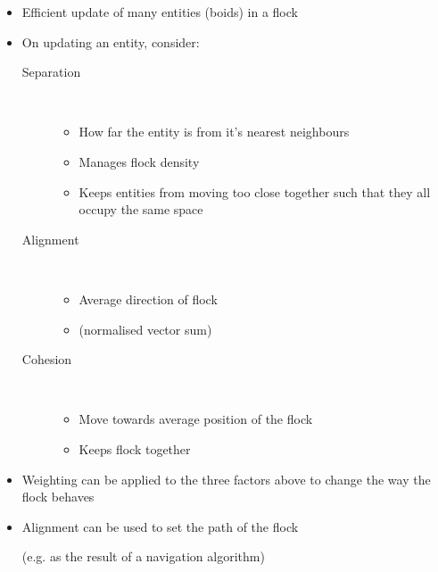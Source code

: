 \documentclass[a4paper]{article}
\begin{document}
\begin{itemize}
  \item
    Efficient update of many entities (boids) in a flock

  \item
    On updating an entity, consider:
    \begin{description}
      \item[Separation] \hfill \\
        \begin{itemize}
          \item
            How far the entity is from it's nearest neighbours

          \item
            Manages flock density

          \item
            Keeps entities from moving too close together such that they all
            occupy the same space

        \end{itemize}

      \item[Alignment] \hfill \\
        \begin{itemize}
          \item
            Average direction of flock

          \item
            (normalised vector sum)

        \end{itemize}

      \item[Cohesion] \hfill \\
        \begin{itemize}
          \item
            Move towards average position of the flock

          \item
            Keeps flock together

        \end{itemize}

    \end{description}

  \item
    Weighting can be applied to the three factors above to change the way the
    flock behaves

  \item
    Alignment can be used to set the path of the flock

    (e.g. as the result of a navigation algorithm)

\end{itemize}
\end{document}
